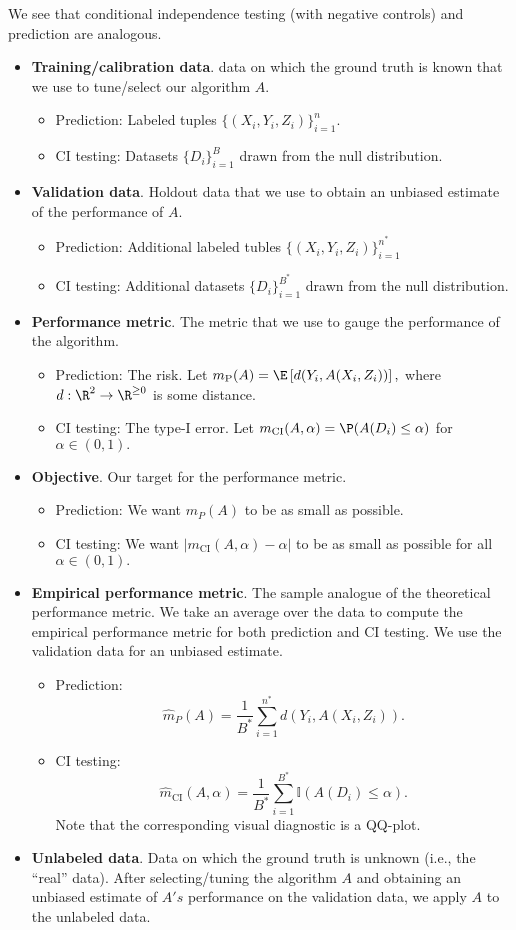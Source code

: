 \documentclass[12pt]{article}
\begin{document}
We see that conditional independence testing (with negative controls) and prediction are analogous.
\begin{itemize}
\item \textbf{Training/calibration data}. data on which the ground truth is known that we use to tune/select our algorithm $A$.
\begin{itemize}
\item Prediction: Labeled tuples $\{ (X_i, Y_i, Z_i) \}_{i=1}^n.$
\item CI testing: Datasets $\{ D_i \}_{i=1}^B$ drawn from the null distribution.
\end{itemize}
\item \textbf{Validation data}. Holdout data that we use to obtain an unbiased estimate of the performance of $A$.
\begin{itemize}
\item Prediction: Additional labeled tubles $\{ (X_i, Y_i, Z_i) \}_{i=1}^{n^*}$
\item CI testing: Additional datasets $\{ D_i \}_{i=1}^{B^*}$ drawn from the null distribution.
\end{itemize}
\item \textbf{Performance metric}. The metric that we use to gauge the performance of the algorithm.
\begin{itemize}
\item Prediction: The risk. Let $m_\textrm{P}(A) = \E\left[ d(Y_i, A( X_i, Z_i )) \right],$ where $d:\R^2 \to \R^{\geq 0}$ is some distance.
\item CI testing: The type-I error. Let $m_\textrm{CI}(A, \alpha) = \P(A(D_i) \leq \alpha)$ for $\alpha \in (0,1).$
\end{itemize}
\item \textbf{Objective}. Our target for the performance metric.
\begin{itemize}
\item Prediction: We want $m_P(A)$ to be as small as possible.
\item CI testing: We want $|m_\textrm{CI}(A, \alpha) - \alpha|$ to be as small as possible for all $\alpha \in (0,1).$
\end{itemize}
\item \textbf{Empirical performance metric}. The sample analogue of the theoretical performance metric. We take an average over the data to compute the empirical performance metric for both prediction and CI testing. We use the validation data for an unbiased estimate.
\begin{itemize}
\item Prediction: $$ \hat{m}_P(A) = \frac{1}{B^*} \sum_{i=1}^{n^*} d( Y_i, A(X_i, Z_i)).$$ 
\item CI testing: $$ \hat{m}_\textrm{CI}(A, \alpha) = \frac{1}{B^*} \sum_{i=1}^{B^*} \mathbb{I}\left( A(D_i) \leq \alpha \right).$$ Note that the corresponding visual diagnostic is a QQ-plot.
\end{itemize}
\item \textbf{Unlabeled data}. Data on which the ground truth is unknown (i.e., the ``real'' data). After selecting/tuning the algorithm $A$ and obtaining an unbiased estimate of $A's$ performance on the validation data, we apply $A$ to the unlabeled data.
\end{itemize}
\end{document}
